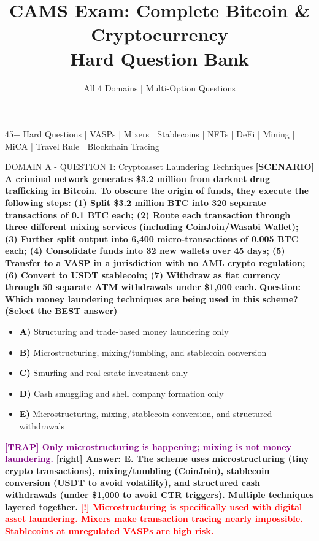 \documentclass[11pt,a4paper]{beamer}
\title[CAMS Exam: Bitcoin \& Crypto Questions]{CAMS Exam: Complete Bitcoin \& Cryptocurrency\\Hard Question Bank}
\author{All 4 Domains | Multi-Option Questions}
\date{}
\newcommand{\redflag}[1]{\textcolor{red}{\textbf{[!] #1}}}
\newcommand{\trap}[1]{\textcolor{purple}{\textbf{[TRAP] #1}}}
\newcommand{\correct}[1]{\textcolor{green!50!black}{\textbf{[right] #1}}}
\newcommand{\scenario}[1]{\textcolor{blue!70!black}{\textbf{[SCENARIO] #1}}}
\newcommand{\option}[1]{\textcolor{black}{\textbf{#1}}}
\begin{document}
\begin{frame}
\titlepage
\centering
\tiny 45+ Hard Questions | VASPs | Mixers | Stablecoins | NFTs | DeFi | Mining | MiCA | Travel Rule | Blockchain Tracing
\end{frame}


\begin{frame}{DOMAIN A - QUESTION 1: Cryptoasset Laundering Techniques}
\scenario{A criminal network generates \$3.2 million from darknet drug trafficking in Bitcoin. To obscure the origin of funds, they execute the following steps: (1) Split \$3.2 million BTC into 320 separate transactions of 0.1 BTC each; (2) Route each transaction through three different mixing services (including CoinJoin/Wasabi Wallet); (3) Further split output into 6,400 micro-transactions of 0.005 BTC each; (4) Consolidate funds into 32 new wallets over 45 days; (5) Transfer to a VASP in a jurisdiction with no AML crypto regulation; (6) Convert to USDT stablecoin; (7) Withdraw as fiat currency through 50 separate ATM withdrawals under \$1,000 each.}
\vspace{0.2cm}
\textbf{Question: Which money laundering techniques are being used in this scheme? (Select the BEST answer)}
\vspace{0.1cm}
\begin{itemize}
    \item \option{A)} Structuring and trade-based money laundering only
    \item \option{B)} Microstructuring, mixing/tumbling, and stablecoin conversion
    \item \option{C)} Smurfing and real estate investment only
    \item \option{D)} Cash smuggling and shell company formation only
    \item \option{E)} Microstructuring, mixing, stablecoin conversion, and structured withdrawals
\end{itemize}
\vspace{0.2cm}
\trap{Only microstructuring is happening; mixing is not money laundering.}
\correct{Answer: E. The scheme uses microstructuring (tiny crypto transactions), mixing/tumbling (CoinJoin), stablecoin conversion (USDT to avoid volatility), and structured cash withdrawals (under \$1,000 to avoid CTR triggers). Multiple techniques layered together.}
\redflag{Microstructuring is specifically used with digital asset laundering. Mixers make transaction tracing nearly impossible. Stablecoins at unregulated VASPs are high risk.}
\end{frame}
\end{document}
